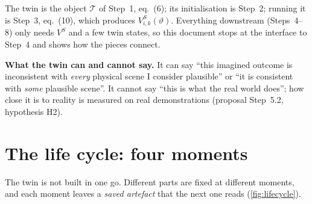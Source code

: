 \documentclass[11pt,a4paper]{article}
\newcommand{\VS}{V^{S}}
\begin{document}
\begin{inprop}
The twin is the object $\mathcal T$ of Step~1, eq.~(6); its initialisation is Step~2; running it is Step~3, eq.~(10), which produces $\VS_{i,k}(\vartheta)$. Everything downstream (Steps~4--8) only needs $\VS$ and a few twin states, so this document stops at the interface to Step~4 and shows how the pieces connect.
\end{inprop}

\textbf{What the twin can and cannot say.} It can say ``this imagined outcome is inconsistent with \emph{every} physical scene I consider plausible'' or ``it is consistent with \emph{some} plausible scene''. It cannot say ``this is what the real world does''; how close it is to reality is measured on real demonstrations (proposal Step~5.2, hypothesis H2).

\section{The life cycle: four moments}\label{sec:lifecycle}
The twin is not built in one go. Different parts are fixed at different moments, and each moment leaves a \emph{saved artefact} that the next one reads (\cref{fig:lifecycle}).
\end{document}
